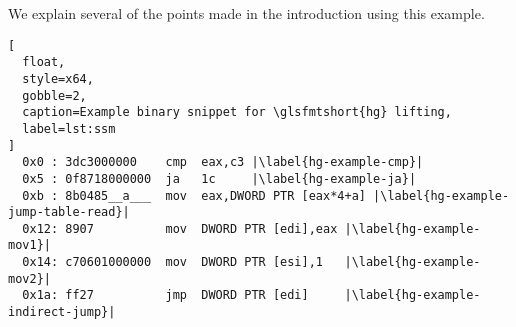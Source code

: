 We explain several of the points made in the introduction using this example.

\begin{lstlisting}[
  float,
  style=x64,
  gobble=2,
  caption=Example binary snippet for \glsfmtshort{hg} lifting,
  label=lst:ssm
]
  0x0 : 3dc3000000    cmp  eax,c3 |\label{hg-example-cmp}|
  0x5 : 0f8718000000  ja   1c     |\label{hg-example-ja}|
  0xb : 8b0485__a___  mov  eax,DWORD PTR [eax*4+a] |\label{hg-example-jump-table-read}|
  0x12: 8907          mov  DWORD PTR [edi],eax |\label{hg-example-mov1}|
  0x14: c70601000000  mov  DWORD PTR [esi],1   |\label{hg-example-mov2}|
  0x1a: ff27          jmp  DWORD PTR [edi]     |\label{hg-example-indirect-jump}|
\end{lstlisting}
